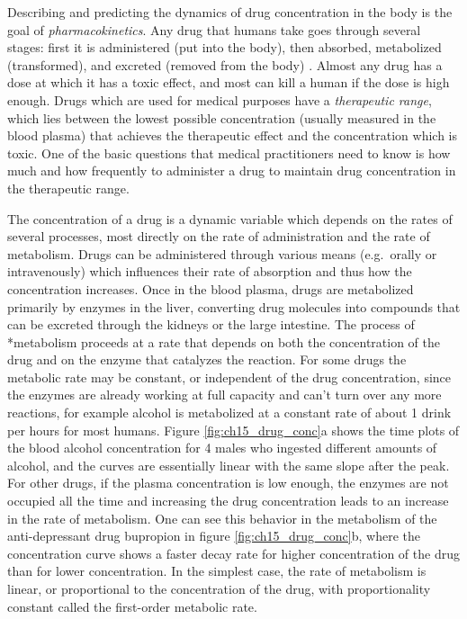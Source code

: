 \documentclass[
  letterpaper,
  DIV=11,
  numbers=noendperiod]{scrreprt}
\begin{document}
Describing and predicting the dynamics of drug concentration in the body
is the goal of  \emph{pharmacokinetics}.
Any drug that humans take goes through several stages: first it is
administered (put into the body), then absorbed, metabolized
(transformed), and excreted (removed from the body)
\cite{rosenbaum_basic_2011}. Almost any drug has a dose at which it has
a toxic effect, and most can kill a human if the dose is high enough.
Drugs which are used for medical purposes have a \emph{therapeutic
range}, which lies between the lowest possible concentration (usually
measured in the blood plasma) that achieves the therapeutic effect and
the concentration which is toxic. One of the basic questions that
medical practitioners need to know is how much and how frequently to
administer a drug to maintain drug concentration in the therapeutic
range.

The concentration of a drug is a dynamic variable which depends on the
rates of several processes, most directly on the rate of administration
and the rate of metabolism. Drugs can be
 administered through various means
(e.g.~orally or intravenously) which influences their rate of absorption
and thus how the concentration increases. Once in the blood plasma,
drugs are metabolized primarily by enzymes in the liver, converting drug
molecules into compounds that can be excreted through the kidneys or the
large intestine. The process of 
*metabolism proceeds at a rate that depends on both the concentration of
the drug and on the enzyme that catalyzes the reaction. For some drugs
the metabolic rate may be constant, or independent of the drug
concentration, since the enzymes are already working at full capacity
and can't turn over any more reactions, for example alcohol is
metabolized at a constant rate of about 1 drink per hours for most
humans. Figure \ref{fig:ch15_drug_conc}a shows the time plots of the
blood alcohol concentration for 4 males who ingested different amounts
of alcohol, and the curves are essentially linear with the same slope
after the peak. For other drugs, if the plasma concentration is low
enough, the enzymes are not occupied all the time and increasing the
drug concentration leads to an increase in the rate of metabolism. One
can see this behavior in the metabolism of the anti-depressant drug
bupropion in figure \ref{fig:ch15_drug_conc}b, where the concentration
curve shows a faster decay rate for higher concentration of the drug
than for lower concentration. In the simplest case, the rate of
metabolism is linear, or proportional to the concentration of the drug,
with proportionality constant called the first-order metabolic rate.
\end{document}
